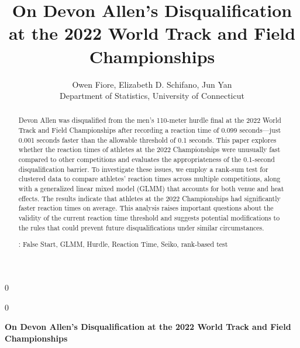 \documentclass[12pt, letterpaper]{article}
\newcommand{\blind}{0}
\begin{document}

\blind
{
  \title{\bf On Devon Allen's Disqualification at the 2022 World Track and Field 
Championships}
  \author{Owen Fiore, %
  Elizabeth D. Schifano, %
  Jun Yan\\[1ex]
  Department of Statistics, University of Connecticut\\
}
\date{}
  \maketitle
} \fi

\blind
{
  \bigskip
  \bigskip
  \bigskip
  \begin{center}
  {\LARGE\bf On Devon Allen's Disqualification at the 2022 World Track and Field 
Championships}
\end{center}
  \bigskip
} \fi


\doublespace


\begin{abstract}
Devon Allen was disqualified from the men's 110-meter hurdle final at
the 2022 World Track and Field Championships after recording a
reaction time of 0.099 seconds—just 0.001 seconds faster than the
allowable threshold of 0.1 seconds. This paper explores whether the
reaction times of athletes at the 2022 Championships were unusually
fast compared to other competitions and evaluates the appropriateness
of the 0.1-second disqualification barrier. To investigate these
issues, we employ a rank-sum test for clustered data to compare
athletes' reaction times across multiple competitions, along with a
generalized linear mixed model (GLMM) that accounts for both venue and
heat effects. The results indicate that athletes at the 2022
Championships had significantly faster reaction times on average. This
analysis raises important questions about the validity of the current
reaction time threshold and suggests potential modifications to the
rules that could prevent future disqualifications under similar
circumstances.


\bigskip{}:
False Start, GLMM, Hurdle, Reaction Time, Seiko, rank-based test

\end{abstract}
\end{document}
